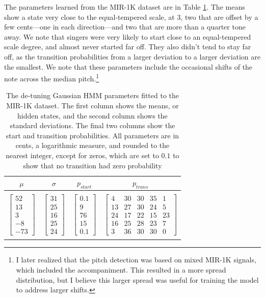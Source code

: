 The parameters learned from the MIR-1K dataset are in Table \ref{tab:detuning-hmm}. The means show a state very close to the equal-tempered scale, at 3, two that are offset by a few cents---one in each direction---and two that are more than a quarter tone away. We note that singers were very likely to start close to an equal-tempered scale degree, and almost never started far off. They also didn't tend to stay far off, as the transition probabilities from a larger deviation to a larger deviation are the smallest. We note that these parameters include the occasional shifts of the note across the median pitch.\footnote{I later realized that the pitch detection was based on mixed MIR-1K signals, which included the accompaniment. This resulted in a more spread distribution, but I believe this larger spread was useful for training the model to address larger shifts.}

\begin{table}[t]
  \begin{center}
    \begin{tabular}{|c|c|c|c|}
    \hline
      $\mu$ & $\sigma$ & $p_{start}$ & $p_{trans}$ \\
      \hline
      &&& \\
      $\left[ \begin{array}{c} 52 \\  13 \\3\\-8\\-73 \end{array}\right]$
      & $\left[ \begin{array}{c} 31  \\ 25\\16\\25\\24 \end{array}\right]$
      & $\left[ \begin{array}{c} 0.1  \\ 9\\76\\15\\0.1 \end{array}\right]$
      & $\left[ \begin{array}{ccccc} 4 & 30 & 30 & 35 & 1  \\ 13&27&30&24&5\\24&17&22&15&23\\16&25&28&23&7\\3&36&30&30&0 \end{array}\right]$  \\
      &&& \\
      \hline
    \end{tabular}
    \label{tab:detuning-hmm}
    \caption{The de-tuning Gaussian HMM parameters fitted to the MIR-1K dataset. The first column shows the means, or hidden states, and the second column shows the standard deviations. The final two columns show the start and transition probabilities. All parameters are in cents, a logarithmic measure, and rounded to the nearest integer, except for zeros, which are set to $0.1$ to show that no transition had zero probability}
  \end{center}
\end{table}

